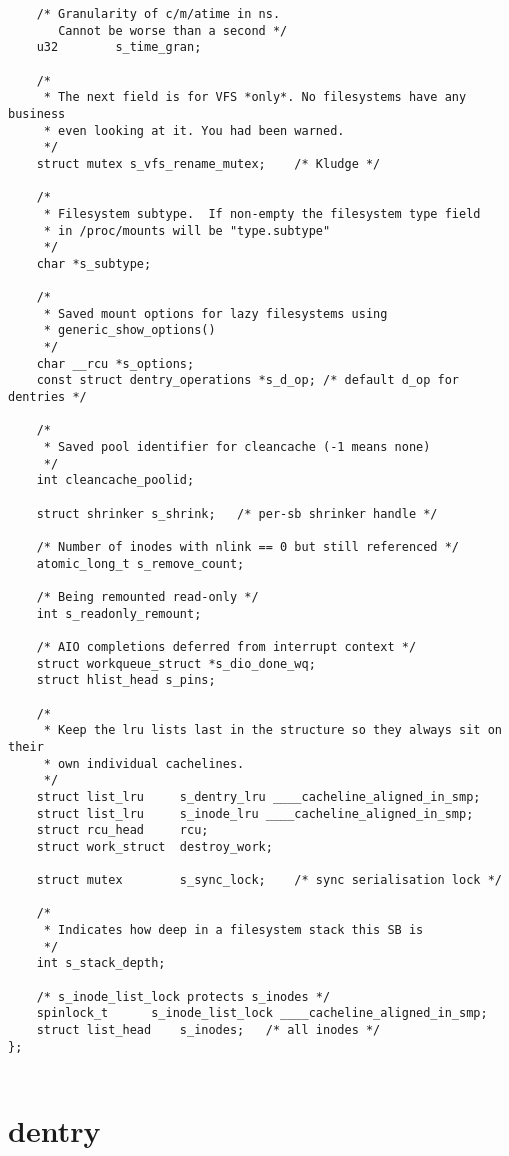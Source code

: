 \begin{lstlisting}
	/* Granularity of c/m/atime in ns.
	   Cannot be worse than a second */
	u32		   s_time_gran;

	/*
	 * The next field is for VFS *only*. No filesystems have any business
	 * even looking at it. You had been warned.
	 */
	struct mutex s_vfs_rename_mutex;	/* Kludge */

	/*
	 * Filesystem subtype.  If non-empty the filesystem type field
	 * in /proc/mounts will be "type.subtype"
	 */
	char *s_subtype;

	/*
	 * Saved mount options for lazy filesystems using
	 * generic_show_options()
	 */
	char __rcu *s_options;
	const struct dentry_operations *s_d_op; /* default d_op for dentries */

	/*
	 * Saved pool identifier for cleancache (-1 means none)
	 */
	int cleancache_poolid;

	struct shrinker s_shrink;	/* per-sb shrinker handle */

	/* Number of inodes with nlink == 0 but still referenced */
	atomic_long_t s_remove_count;

	/* Being remounted read-only */
	int s_readonly_remount;

	/* AIO completions deferred from interrupt context */
	struct workqueue_struct *s_dio_done_wq;
	struct hlist_head s_pins;

	/*
	 * Keep the lru lists last in the structure so they always sit on their
	 * own individual cachelines.
	 */
	struct list_lru		s_dentry_lru ____cacheline_aligned_in_smp;
	struct list_lru		s_inode_lru ____cacheline_aligned_in_smp;
	struct rcu_head		rcu;
	struct work_struct	destroy_work;

	struct mutex		s_sync_lock;	/* sync serialisation lock */

	/*
	 * Indicates how deep in a filesystem stack this SB is
	 */
	int s_stack_depth;

	/* s_inode_list_lock protects s_inodes */
	spinlock_t		s_inode_list_lock ____cacheline_aligned_in_smp;
	struct list_head	s_inodes;	/* all inodes */
};
        
\end{lstlisting}


\section{dentry}

